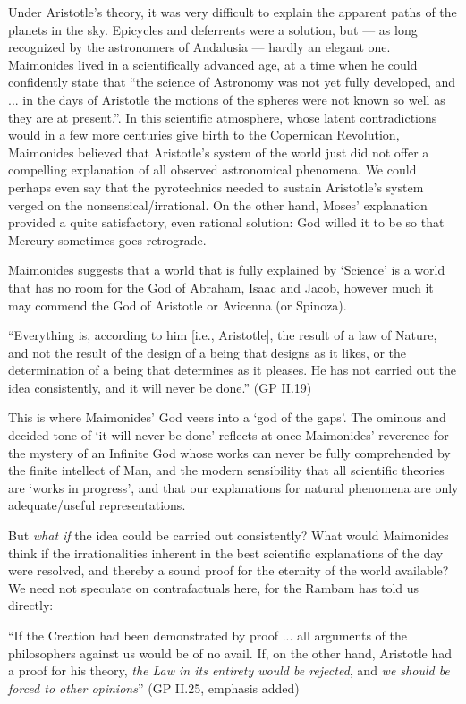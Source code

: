 \documentclass[12pt]{article}
\begin{document}
Under Aristotle's theory, it was very difficult to explain the apparent paths of the planets in the sky. Epicycles and deferrents were a solution, but --- as long recognized by the astronomers of Andalusia --- hardly an elegant one. Maimonides lived in a scientifically advanced age, at a time when he could confidently state that ``the science of Astronomy was not yet fully developed, and ... in the days of Aristotle the motions of the spheres were not known so well as they are at present.''. In this scientific atmosphere, whose latent contradictions would in a few more centuries give birth to the Copernican Revolution, Maimonides believed that Aristotle's system of the world just did not offer a compelling explanation of all observed astronomical phenomena. We could perhaps even say that the pyrotechnics needed to sustain Aristotle's system verged on the nonsensical/irrational. On the other hand, Moses' explanation provided a quite satisfactory, even rational solution: God willed it to be so that Mercury sometimes goes retrograde.

Maimonides suggests that a world that is fully explained by `Science' is a world that has no room for the God of Abraham, Isaac and Jacob, however much it may commend the God of Aristotle or Avicenna (or Spinoza). 
\begin{displayquote}
``Everything is, according to him [i.e., Aristotle], the result of a law of Nature, and not the result of the design of a being that designs as it likes, or the determination of a being that determines as it pleases. He has not carried out the idea consistently, and it will never be done.'' \hfill (GP II.19)
\end{displayquote}

This is where Maimonides' God veers into a `god of the gaps'. The ominous and decided tone of `it will never be done' reflects at once Maimonides' reverence for the mystery of an Infinite God whose works can never be fully comprehended by the finite intellect of Man, and the modern sensibility that all scientific theories are `works in progress', and that our explanations for natural phenomena are only adequate/useful representations.

But \emph{what if} the idea could be carried out consistently? What would Maimonides think if the irrationalities inherent in the best scientific explanations of the day were resolved, and thereby a sound proof for the eternity of the world available? We need not speculate on contrafactuals here, for the Rambam has told us directly:
\begin{displayquote}
``If the Creation had been demonstrated by proof ... all arguments of the philosophers against us would be of no avail. If, on the other hand, Aristotle had a proof for his theory, \emph{the Law in its entirety would be rejected}, and \emph{we should be forced to other opinions}'' \hfill (GP II.25, emphasis added)
\end{displayquote}
\end{document}
